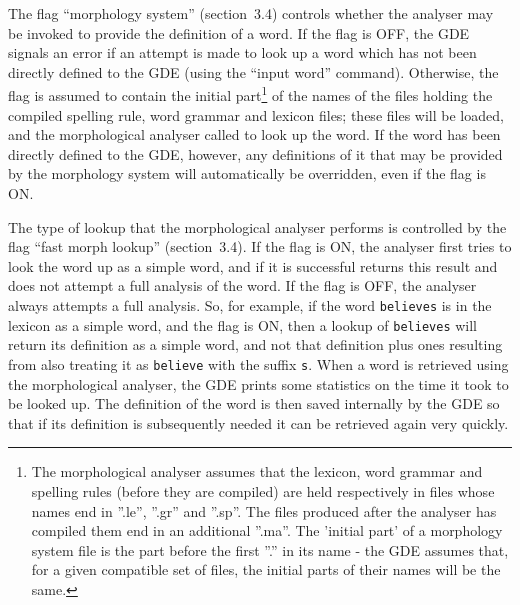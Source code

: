 The flag ``morphology system'' (section~3.4) controls whether the
analyser may be invoked to provide the definition of a word. If the flag
is OFF, the GDE signals an error if an attempt is made to look up a word
which has not been directly defined to the GDE (using the ``input word''
command). Otherwise, the flag is assumed to contain the initial
part\footnote{The morphological analyser assumes that the lexicon, word grammar
and spelling rules (before they are compiled) are held respectively in files
whose names end in ''.le'', ''.gr'' and ''.sp''. The files produced after the
analyser has compiled them end in an additional ''.ma''. The 'initial
part' of a morphology system file is the part before the first ''.'' in
its name - the GDE assumes that, for a given compatible set of files,
the initial parts of their names will be the same.}
of the names of the files holding the compiled spelling rule, word
grammar and lexicon files; these files will be loaded, and the
morphological analyser called to look up the word. If the word has been
directly defined to the GDE, however, any definitions of it that may be
provided by the morphology system will automatically be overridden, even
if the flag is ON.

The type of lookup that the morphological analyser performs is
controlled by the flag ``fast morph lookup'' (section~3.4). If the flag is
ON, the analyser first tries to look the word up as a simple word, and if it
is successful returns this result and does not attempt a full analysis of
the word. If the flag is OFF, the analyser always attempts a full
analysis. So, for example, if the word {\tt believes} is in the
lexicon as a simple word, and the flag is ON, then a lookup of
{\tt believes} will return its definition as a simple word, and not that
definition plus ones resulting from also treating it as {\tt believe}
with the suffix {\tt s}. When a word is retrieved using the
morphological analyser, the GDE prints some statistics on the time it
took to be looked up. The definition of the word is then saved
internally by the GDE so that if its definition is subsequently needed
it can be retrieved again very quickly.

